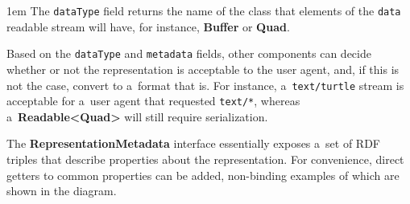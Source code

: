 \documentclass[10pt]{article}
\newcommand\component[1]{\mbox{\bf #1}}
\newcommand\field[1]{\mbox{\tt #1}}
\newenvironment{Note}
  {\begin{multicols}{3}%
     \parskip 1em}
  {\end{multicols}}
\begin{document}

\bigskip

\begin{Note}
The \field{dataType} field returns the name of the class
that elements of the \field{data} readable stream will have,
for instance,
\component{Buffer} or \component{Quad}.
\columnbreak

Based on the \field{dataType} and \field{metadata} fields,
other components can decide whether or not the representation
is acceptable to the user agent,
and, if this is not the case,
convert to a~format that is.
For instance,
a~\verb!text/turtle! stream is acceptable
for a~user agent that requested \verb!text/*!,
whereas a~\component{Readable<Quad>} will still require serialization.

\columnbreak
The \component{RepresentationMetadata} interface
essentially exposes a~set of RDF triples
that describe properties about the representation.
For convenience,
direct getters to common properties can be added,
non-binding examples of which are shown in the diagram.

\end{Note}
\end{document}
